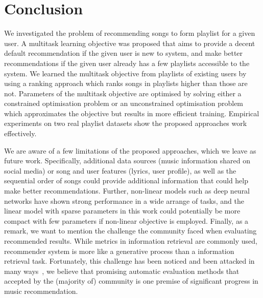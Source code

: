 \section{Conclusion}
We investigated the problem of recommending songs to form playlist for a given user.
A multitask learning objective was proposed that aims to provide a decent default recommendation 
if the given user is new to system, and make better recommendations if the given user already has 
a few playlists accessible to the system.
We learned the multitask objective from playlists of existing users by using a ranking approach 
which ranks songs in playlists higher than those are not.
Parameters of the multitask objective are optimised by solving either a constrained optimisation problem 
or an unconstrained optimisation problem which approximates the objective but results in more efficient training.
Empirical experiments on two real playlist datasets show the proposed approaches work effectively.

We are aware of a few limitations of the proposed approaches, which we leave as future work.
Specifically, additional data sources (\eg music information shared on social media) or song and 
user features (\eg lyrics, user profile), as well as the sequential order of songs could provide 
additional information that could help make better recommendations.
Further, non-linear models such as deep neural networks have shown strong performance in a wide arrange of tasks,
and the linear model with sparse parameters in this work could potentially be more compact with few parameters 
if non-linear objective is employed.
Finally, as a remark, we want to mention the challenge the community faced when evaluating recommended results.
While metrics in information retrieval are commonly used, recommender system is more like a generative process
than a information retrieval task. Fortunately, this challenge has been noticed and been attacked in many 
ways~\cite{schedl2017}, we believe that promising automatic evaluation methods that accepted by the (majority of) 
community is one premise of significant progress in music recommendation.
